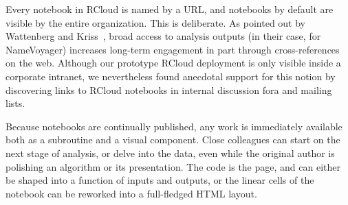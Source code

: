 Every notebook in RCloud is named by a URL, and notebooks by
default are visible by the entire organization. This is deliberate.
As pointed out by Wattenberg and Kriss~\cite{Wattenberg:2011:DFS},
broad access to analysis outputs (in their case, for NameVoyager)
increases long-term engagement in part through cross-references on
the web. Although our prototype RCloud deployment is only visible
inside a corporate intranet, we nevertheless found anecdotal support
for this notion by discovering links to RCloud notebooks in internal
discussion fora and mailing lists.

Because notebooks are continually published, any work is immediately
available both as a subroutine and a visual component. Close colleagues
can start on the next stage of analysis, or delve into the data,
even while the original author is polishing an algorithm or its
presentation. The code is the page, and can either be shaped into
a function of inputs and outputs, or the linear cells of the notebook
can be reworked into a full-fledged HTML layout.
